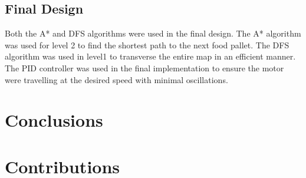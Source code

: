 \documentclass{article}
\begin{document}
\subsection{Final Design}

Both the A* and DFS algorithms were used in the final design. The A* algorithm was used for level 2 to find the shortest path to the next food pallet. The DFS algorithm was used in level1 to transverse the entire map in an efficient manner. The PID controller was used in the final implementation to ensure the motor were travelling at the desired speed with minimal oscillations.


\section{Conclusions}

\clearpage

\section{Contributions}
\end{document}
